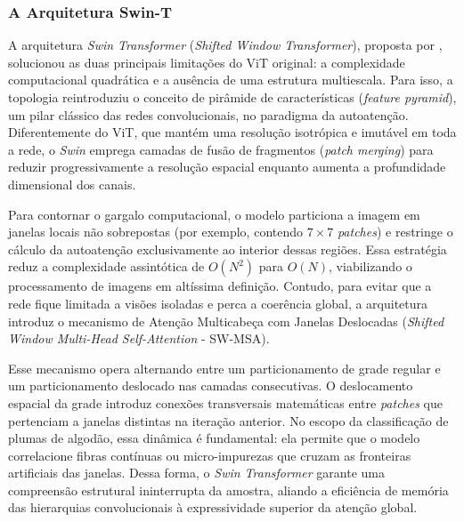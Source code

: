 
    \subsubsection{A Arquitetura Swin-T}

        A arquitetura \textit{Swin Transformer} (\textit{Shifted Window Transformer}), proposta por , solucionou as duas principais limitações do ViT original: a complexidade computacional quadrática e a ausência de uma estrutura multiescala. Para isso, a topologia reintroduziu o conceito de pirâmide de características (\textit{feature pyramid}), um pilar clássico das redes convolucionais, no paradigma da autoatenção. Diferentemente do ViT, que mantém uma resolução isotrópica e imutável em toda a rede, o \textit{Swin} emprega camadas de fusão de fragmentos (\textit{patch merging}) para reduzir progressivamente a resolução espacial enquanto aumenta a profundidade dimensional dos canais.

        Para contornar o gargalo computacional, o modelo particiona a imagem em janelas locais não sobrepostas (por exemplo, contendo $7 \times 7$ \textit{patches}) e restringe o cálculo da autoatenção exclusivamente ao interior dessas regiões. Essa estratégia reduz a complexidade assintótica de $O(N^2)$ para $O(N)$, viabilizando o processamento de imagens em altíssima definição. Contudo, para evitar que a rede fique limitada a visões isoladas e perca a coerência global, a arquitetura introduz o mecanismo de Atenção Multicabeça com Janelas Deslocadas (\textit{Shifted Window Multi-Head Self-Attention} - SW-MSA).

        Esse mecanismo opera alternando entre um particionamento de grade regular e um particionamento deslocado nas camadas consecutivas. O deslocamento espacial da grade introduz conexões transversais matemáticas entre \textit{patches} que pertenciam a janelas distintas na iteração anterior. No escopo da classificação de plumas de algodão, essa dinâmica é fundamental: ela permite que o modelo correlacione fibras contínuas ou micro-impurezas que cruzam as fronteiras artificiais das janelas. Dessa forma, o \textit{Swin Transformer} garante uma compreensão estrutural ininterrupta da amostra, aliando a eficiência de memória das hierarquias convolucionais à expressividade superior da atenção global.


